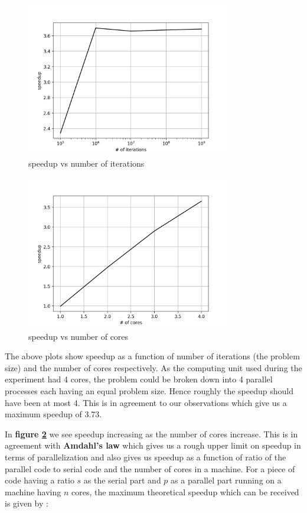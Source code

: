 \documentclass[12,a4paper]{article}
\begin{document}
    \begin{figure}[H]
        \centering
        \includegraphics[width=0.8\textwidth]{plots/q1p1.png}
        \caption{speedup vs number of iterations}
        \label{fig:q1p1}
    \end{figure}
    \begin{figure}[H]
        \centering
        \includegraphics[width=0.8\textwidth]{plots/q1p2.png}
        \caption{speedup vs number of cores}
        \label{fig:q1p2}
    \end{figure}
    
    The above plots show speedup as a function of number of iterations (the problem size) and the number of cores respectively. As the computing unit used during the experiment had 4 cores, the problem could be broken down into 4 parallel processes each having an equal problem size. Hence roughly the speedup should have been at most 4. This is in agreement to our observations which give us a maximum speedup of 3.73.
    
    In \textbf{figure \ref{fig:q1p2}} we see speedup increasing as the number of cores increase. This is in agreement with \textbf{Amdahl's law} which gives us a rough upper limit on speedup in terms of parallelization and also gives us speedup as a function of ratio of the parallel code to serial code and the number of cores in a machine.
    For a piece of code having a ratio $s$ as the serial part and $p$ as a parallel part running on a machine having $n$ cores, the maximum theoretical speedup which can be received is given by :
    
\end{document}
